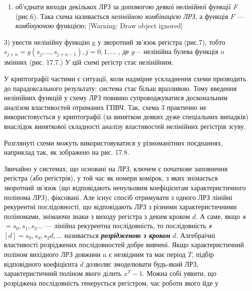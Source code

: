 \bigskip

{\par}


\bigskip


\bigskip

\liststyleWWviiiNumxlvii
\setcounter{saveenum}{\value{enumi}}
\begin{enumerate}
\setcounter{enumi}{\value{saveenum}}
\item об’єднати виходи декількох ЛРЗ за допомогою деякої нелінійної функції
\textit{F} (рис.6). Така схема називається \textit{нелінійною комбінацією ЛРЗ},
а функція  $F$ --- \textit{комбінуючою }функцією; [Warning: Draw object
ignored]
\end{enumerate}
3)  увести нелінійну функцію g у зворотний зв’язок регістра (рис.7), тобто 
$s_{j+n}=g(s_j,\dots,s_{j+n-1}),j=0,1,\dots$
, де  $g$--- нелінійна булева функція  $n$ змінних (рис. 17.7.)  У цій схемі 
регістр стає нелінійним. 


\bigskip


\bigskip

{\par}


\bigskip

 У криптографії частими є ситуації, коли надмірне ускладнення схеми призводить
до парадоксального результату: система стає більш вразливою. Тому введення
нелінійних функцій у схему ЛРЗ повинно супроводжуватися доскональним аналізом
властивостей отриманих ГПВЧ.  Так, схема 3 практично не використовується у
криптографії (за винятком деяких дуже спеціальних випадків)  внаслідок
виняткової складності  аналізу властивостей нелінійних регістрів зсуву.

Розглянуті схеми можуть використовуватися у різноманітних поєднаннях, наприклад
так, як зображено на рис. 17.8. 

Звичайно у системах, що основані на ЛРЗ, ключем є початкове заповнення регістра
(або регістрів), у той час як номери комірок, з яких знімається зворотний
зв’язок (що відповідають ненульовим коефіцієнтам характеристичного полінома
ЛРЗ), фіксовані. Але існує спосіб отримувати з одного ЛРЗ лінійні рекурентні
послідовності, що відповідають ЛРЗ з різними характеристичними поліномами,
знімаючи знаки з виходу регістра з деким кроком  $d$. А саме, якщо
\textbf{\textit{s}} $=s_{0},s_{1},s_2\dots$ ---
лінійна рекурентна послідовність, то послідовність \textbf{\textit{s}}
$[d]=s_{0},s_{d},s_2d,\dots$ називається
\textbf{\textit{розрідженою з кроком}}\textbf{ } $d$. Алгебраїчні властивості
розріджених послідовностей добре вивчені. Якщо характеристичний поліном
вихідного ЛРЗ довжини n є незвідним та має період  $T$, підбір відповідного
коефіцієнта  $d$ дозволяє змоделювати будь-який ЛРЗ, характеристичний поліном
якого ділить  $x^T-1$. Можна собі уявити, що розріджена послідовність
генерується регістром, час роботи якого йде у

